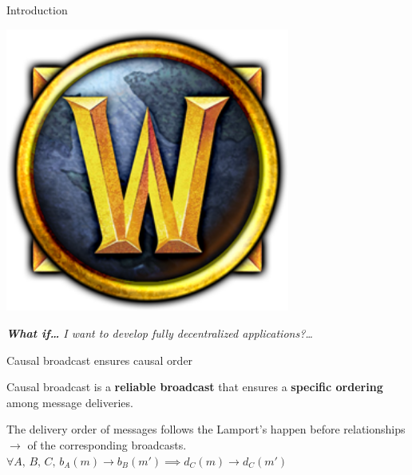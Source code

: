 \documentclass[10pt, xcolor={usenames, dvipsnames}]{beamer}
\begin{document}
\begin{frame}{Introduction}
\begin{minipage}{0.15\textwidth}
    \end{minipage}
    \begin{minipage}{0.15\textwidth}
      \centering
      \includegraphics[width=0.7\textwidth]{logos/wow.png}
    \end{minipage}

    \vspace{3em}  

    \textit{\textbf{What if\ldots} I want to develop fully decentralized
      applications?\ldots}

\end{frame}


\begin{frame}{Causal broadcast ensures causal order}

  Causal broadcast is a \textbf{reliable broadcast} that ensures a
  \textbf{specific ordering} among message deliveries.
  
  \vspace{1em}

  \begin{definition}
    The delivery order of messages follows the Lamport's happen before relationships
    $\rightarrow$ of the corresponding broadcasts.
    $\forall A,\,B,\,C,\, b_A(m) \rightarrow b_B(m') \implies d_C(m) \rightarrow
    d_C(m')$
  \end{definition}
  
  \begin{minipage}{0.49\textwidth}
      
  \end{minipage}~~
  \begin{minipage}{0.49\textwidth}
    \begin{center}
      
    \end{center}
  \end{minipage}


\end{frame}
\end{document}

